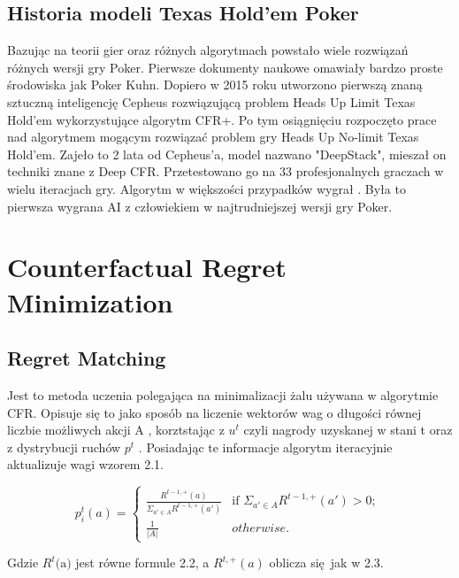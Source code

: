 \documentclass[12pt,oneside,a4paper]{report}
\begin{document}
\subsection{Historia modeli Texas Hold'em Poker}

Bazując na teorii gier oraz różnych algorytmach powstało wiele rozwiązań różnych wersji gry Poker.
Pierwsze dokumenty naukowe omawiały bardzo proste
środowiska jak Poker Kuhn.
Dopiero w 2015 roku utworzono pierwszą znaną sztuczną inteligencję Cepheus rozwiązującą problem
Heads Up Limit Texas Hold'em wykorzystujące algorytm CFR+. Po tym osiągnięciu rozpoczęto prace nad
algorytmem mogącym rozwiązać problem gry Heads Up No-limit Texas Hold'em. Zajeło to 2 lata od 
Cepheus'a, model nazwano "DeepStack", mieszał on techniki znane z Deep CFR. 
Przetestowano go na 33 profesjonalnych graczach w wielu iteracjach gry. Algorytm w większości
przypadków wygrał \cite{ds}. Była to pierwsza wygrana AI z człowiekiem w najtrudniejszej wersji gry Poker.

\section{Counterfactual Regret Minimization}

\subsection{Regret Matching}

Jest to metoda uczenia polegająca na minimalizacji żalu używana w algorytmie CFR.
Opisuje się to jako sposób na liczenie wektorów wag o długości równej liczbie możliwych akcji A
, korztstając z $u^{t}$ czyli nagrody uzyskanej w stani t oraz z dystrybucji ruchów $p^{t}$ \cite{rmg}. 
Posiadając te informacje algorytm iteracyjnie aktualizuje wagi wzorem 2.1.


\begin{equation}
p^{t}_{i}\left( a \right) = \left\{ \begin{array}{ll}
      \frac{R^{t-1, \text{+}}\left(a\right)}{ \Sigma_{a' \in A} R^{t-1,\text{+}}\left(a'\right)} &
      \mbox{if $\Sigma_{a' \in A} R^{t-1,\text{+}}\left(a'\right) >
      0$};\\
      \frac{1}{|A|} & \mbox{$otherwise$}.\end{array} \right. \ 
\end{equation}

Gdzie $R^{t} \text{(a)}$ jest równe formule 2.2, a $R^{t,\text{+}}(a)$ oblicza się jak w 2.3.
\end{document}
